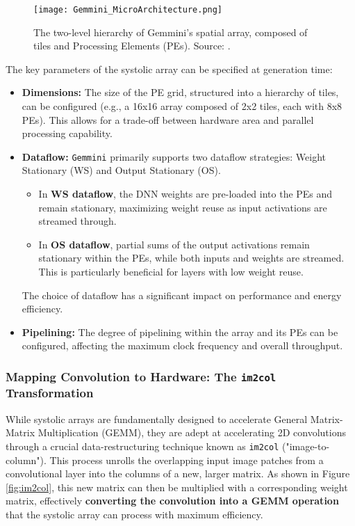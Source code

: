 \begin{figure}[htbp]
    \centering
    \texttt{[image: Gemmini\_MicroArchitecture.png]}
    \caption[Microarchitecture of Gemmini's Spatial Array]{The two-level hierarchy of Gemmini's spatial array, composed of tiles and Processing Elements (PEs). Source: \cite{gemini-dac}.}
    \label{fig:gemmini_microarch}
\end{figure}

The key parameters of the systolic array can be specified at generation time:
\begin{itemize}
    \item \textbf{Dimensions:} The size of the PE grid, structured into a hierarchy of tiles, can be configured (e.g., a 16x16 array composed of 2x2 tiles, each with 8x8 PEs). This allows for a trade-off between hardware area and parallel processing capability.
    \item \textbf{Dataflow:} \texttt{Gemmini} primarily supports two dataflow strategies: Weight Stationary (WS) and Output Stationary (OS). 
    \begin{itemize}
        \item In \textbf{WS dataflow}, the DNN weights are pre-loaded into the PEs and remain stationary, maximizing weight reuse as input activations are streamed through. 
        \item In \textbf{OS dataflow}, partial sums of the output activations remain stationary within the PEs, while both inputs and weights are streamed. This is particularly beneficial for layers with low weight reuse.
    \end{itemize}
    The choice of dataflow has a significant impact on performance and energy efficiency.
    \item \textbf{Pipelining:} The degree of pipelining within the array and its PEs can be configured, affecting the maximum clock frequency and overall throughput.
\end{itemize}

\subsubsection{Mapping Convolution to Hardware: The \texttt{im2col} Transformation}
\label{subsubsec:im2col}
While systolic arrays are fundamentally designed to accelerate General Matrix-Matrix Multiplication (GEMM), they are adept at accelerating 2D convolutions through a crucial data-restructuring technique known as \texttt{im2col} ("image-to-column"). This process unrolls the overlapping input image patches from a convolutional layer into the columns of a new, larger matrix. As shown in Figure \ref{fig:im2col}, this new matrix can then be multiplied with a corresponding weight matrix, effectively \textbf{converting the convolution into a GEMM operation} that the systolic array can process with maximum efficiency.

